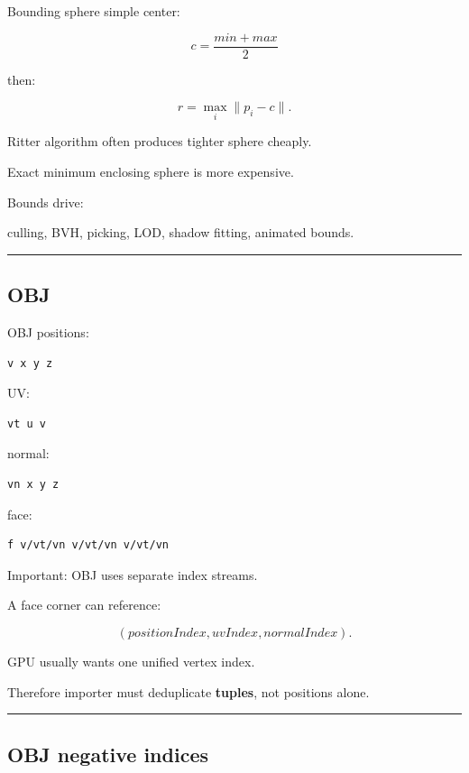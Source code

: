 Bounding sphere simple center:

\[
c=
\frac{min+max}{2}
\]

then:

\[
r=
\max_i\|p_i-c\|.
\]

Ritter algorithm often produces tighter sphere cheaply.

Exact minimum enclosing sphere is more expensive.

Bounds drive:

culling, BVH, picking, LOD, shadow fitting, animated bounds.

\begin{center}\rule{0.5\linewidth}{0.5pt}\end{center}

\subsection{OBJ}\label{04-visual-computing-ii-ch041-obj}

\hypertarget{04-visual-computing-ii-ch041-obj}{}

OBJ positions:

\begin{verbatim}
v x y z
\end{verbatim}

UV:

\begin{verbatim}
vt u v
\end{verbatim}

normal:

\begin{verbatim}
vn x y z
\end{verbatim}

face:

\begin{verbatim}
f v/vt/vn v/vt/vn v/vt/vn
\end{verbatim}

Important: OBJ uses separate index streams.

A face corner can reference:

\[
(positionIndex,
uvIndex,
normalIndex).
\]

GPU usually wants one unified vertex index.

Therefore importer must deduplicate \textbf{tuples}, not positions alone.

\begin{center}\rule{0.5\linewidth}{0.5pt}\end{center}

\subsection{OBJ negative indices}\label{04-visual-computing-ii-ch041-obj-negative-indices}

